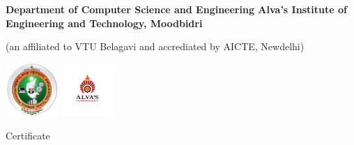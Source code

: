 \documentclass{article}
\begin{document}
\begin{center}
 \LARGE \bfseries{Department of Computer Science and Engineering}
 \LARGE \bfseries{Alva's Institute of Engineering and Technology, Moodbidri}
 
 \begin{small}
 (an affiliated to VTU Belagavi and accrediated by AICTE, Newdelhi)
 
 \vspace{1cm}
 \includegraphics[width=2cm]{VTU-logo.jpg}
 \includegraphics[width=2cm]{Alvas-logo.png}
 \end{small}
 \vspace{0.5cm}
 
 \Huge{Certificate}
 \vspace{1cm}
 \begin{large}
 

\end{large}
\end{center}
\end{document}
